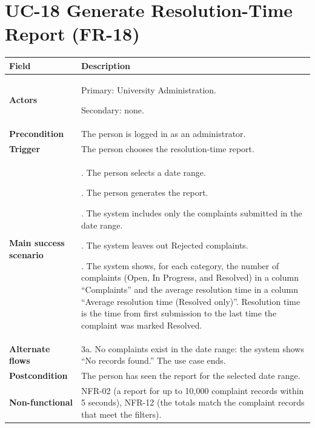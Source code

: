 \documentclass[11pt,a4paper]{report}
\begin{document}
\section{UC-18 Generate Resolution-Time Report (FR-18)}
\begin{longtable}{|>{\raggedright\arraybackslash}p{3.0cm}|>{\raggedright\arraybackslash}p{12.4cm}|}
\hline \textbf{Field} & \textbf{Description} \\ \hline \endhead
\textbf{Actors} & Primary: University Administration.\par\smallskip Secondary: none. \\ \hline
\textbf{Precondition} & The person is logged in as an administrator. \\ \hline
\textbf{Trigger} & The person chooses the resolution-time report. \\ \hline
\textbf{Main success scenario} & 1. The person selects a date range.\par\smallskip 2. The person generates the report.\par\smallskip 3. The system includes only the complaints submitted in the date range.\par\smallskip 4. The system leaves out Rejected complaints.\par\smallskip 5. The system shows, for each category, the number of complaints (Open, In Progress, and Resolved) in a column ``Complaints'' and the average resolution time in a column ``Average resolution time (Resolved only)''. Resolution time is the time from first submission to the last time the complaint was marked Resolved. \\ \hline
\textbf{Alternate flows} & 3a. No complaints exist in the date range: the system shows ``No records found.'' The use case ends. \\ \hline
\textbf{Postcondition} & The person has seen the report for the selected date range. \\ \hline
\textbf{Non-functional} & NFR-02 (a report for up to 10,000 complaint records within 5 seconds), NFR-12 (the totals match the complaint records that meet the filters). \\ \hline
\end{longtable}
\end{document}
